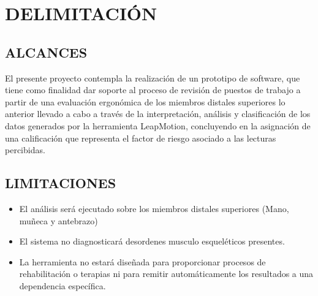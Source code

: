 \chapter{DELIMITACIÓN}
\section{ALCANCES}
El presente proyecto contempla la realización de un prototipo de software, que tiene como finalidad dar soporte al proceso de revisión de puestos de trabajo a partir de una evaluación ergonómica de los miembros distales superiores lo anterior llevado a cabo a través de la interpretación, análisis y clasificación de los datos generados por la herramienta LeapMotion, concluyendo en la asignación de una calificación que representa el factor de riesgo asociado a las lecturas percibidas.

\section{LIMITACIONES}
\begin{itemize}
\item El análisis será ejecutado sobre los miembros distales superiores (Mano, muñeca y antebrazo)
\item El sistema no diagnosticará desordenes musculo esqueléticos presentes.
\item La herramienta no estará diseñada para proporcionar procesos de rehabilitación o terapias ni para remitir automáticamente los resultados a una dependencia específica.
\end{itemize}